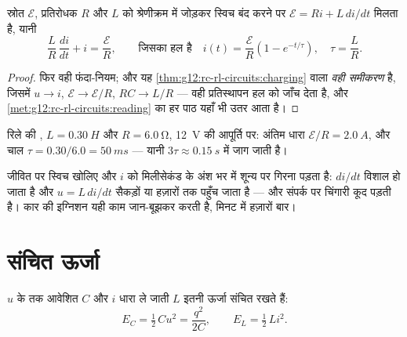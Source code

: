 \begin{proposition}[RL परिपथ में धारा का चढ़ाव]\label{prop:g12:rc-rl-circuits:rl}
स्रोत $\mathcal{E}$, प्रतिरोधक $R$ और  $L$ को श्रेणीक्रम में
जोड़कर स्विच बंद करने पर $\mathcal{E} = Ri + L\,di/dt$ मिलता है, यानी
\[
\frac{L}{R}\,\frac{di}{dt} + i = \frac{\mathcal{E}}{R},
\qquad\text{जिसका हल है}\quad
i(t) = \frac{\mathcal{E}}{R}\left(1 - e^{-t/\tau}\right),
\quad \tau = \frac{L}{R} .
\]
\end{proposition}

\begin{proof}
फिर वही फंदा-नियम; और यह \cref{thm:g12:rc-rl-circuits:charging} वाला \emph{वही समीकरण} है, जिसमें $u \to i$,
$\mathcal{E} \to \mathcal{E}/R$, $RC \to L/R$ --- वही प्रतिस्थापन हल को जाँच देता है, और \cref{met:g12:rc-rl-circuits:reading} का हर
पाठ यहाँ भी उतर आता है।
\end{proof}

\begin{example}[विद्युत्चुंबक जागता है]\label{ex:g12:rc-rl-circuits:rl}
रिले की , $L = \qty{0.30}{H}$ और $R = \qty{6.0}{\ohm}$, \qty{12}{V} की आपूर्ति पर: अंतिम धारा
$\mathcal{E}/R = \qty{2.0}{A}$, और चाल $\tau = 0.30/6.0 = \qty{50}{ms}$ --- यानी $3\tau \approx
\qty{0.15}{s}$ में जाग जाती है।
\end{example}

\begin{remark}[खोलने पर उठती चिंगारी]\label{rem:g12:rc-rl-circuits:spark}
जीवित  पर स्विच खोलिए और $i$ को मिलीसेकंड के अंश भर में
शून्य पर गिरना पड़ता है: $di/dt$ विशाल हो जाता है और $u = L\,di/dt$ सैकड़ों या हज़ारों
 तक पहुँच जाता है --- और संपर्क पर चिंगारी कूद पड़ती है। कार की
इग्निशन  यही काम जान-बूझकर करती है, मिनट में हज़ारों बार।
\end{remark}

\section{संचित ऊर्जा}

\begin{proposition}[संधारित्र में ऊर्जा, कुंडली में ऊर्जा]\label{prop:g12:rc-rl-circuits:energy}
$u$ के  तक आवेशित  $C$ और $i$
धारा ले जाती  $L$ इतनी ऊर्जा संचित रखते हैं:
\[
E_C = \tfrac12\,C u^2 = \frac{q^2}{2C},
\qquad
E_L = \tfrac12\,L i^2 .
\]
\end{proposition}

